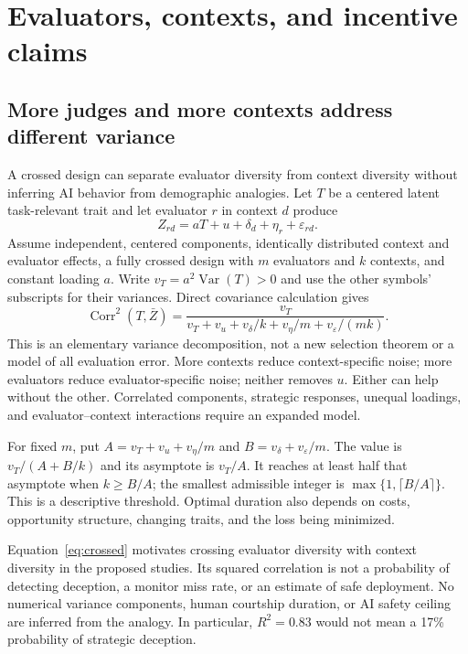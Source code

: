 \section{Evaluators, contexts, and incentive claims}
\label{app:care}

\subsection{More judges and more contexts address different variance}
A crossed design can separate evaluator diversity from context diversity without inferring AI behavior from demographic analogies. Let $T$ be a centered latent task-relevant trait and let evaluator $r$ in context $d$ produce
\[
 Z_{rd}=aT+u+\delta_d+\eta_r+\varepsilon_{rd}.
\]
Assume independent, centered components, identically distributed context and evaluator effects, a fully crossed design with $m$ evaluators and $k$ contexts, and constant loading $a$. Write $v_T=a^2\operatorname{Var}(T)>0$ and use the other symbols' subscripts for their variances. Direct covariance calculation gives
\begin{equation}
\operatorname{Corr}^2(T,\bar Z)=
\frac{v_T}{v_T+v_u+v_\delta/k+v_\eta/m+v_\varepsilon/(mk)}.
\label{eq:crossed}
\end{equation}
This is an elementary variance decomposition, not a new selection theorem or a model of all evaluation error. More contexts reduce context-specific noise; more evaluators reduce evaluator-specific noise; neither removes $u$. Either can help without the other. Correlated components, strategic responses, unequal loadings, and evaluator--context interactions require an expanded model.

For fixed $m$, put $A=v_T+v_u+v_\eta/m$ and $B=v_\delta+v_\varepsilon/m$. The value is $v_T/(A+B/k)$ and its asymptote is $v_T/A$. It reaches at least half that asymptote when $k\ge B/A$; the smallest admissible integer is $\max\{1,\lceil B/A\rceil\}$. This is a descriptive threshold. Optimal duration also depends on costs, opportunity structure, changing traits, and the loss being minimized.

Equation~\ref{eq:crossed} motivates crossing evaluator diversity with context diversity in the proposed studies. Its squared correlation is not a probability of detecting deception, a monitor miss rate, or an estimate of safe deployment. No numerical variance components, human courtship duration, or AI safety ceiling are inferred from the analogy. In particular, $R^2=0.83$ would not mean a 17\% probability of strategic deception.

